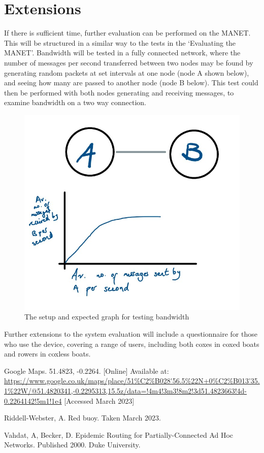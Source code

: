 \documentclass[10pt, a4paper]{article}
\begin{document}
\section{Extensions}
If there is sufficient time, further evaluation can be performed on the MANET. This will be structured in a similar way to the tests in the `Evaluating the MANET'. Bandwidth will be tested in a fully connected network, where the number of messages per second transferred between two nodes may be found by generating random packets at set intervals at one node (node A shown below), and seeing how many are passed to another node (node B below). 
This test could then be performed with both nodes generating and receiving messages, to examine bandwidth on a two way connection.\\
\begin{figure}[h]
\caption{The setup and expected graph for testing bandwidth}
\begin{center}
\includegraphics[scale=0.3]{bandwidth.jpg}
\end{center}
\end{figure}

Further extensions to the system evaluation will include a questionnaire for those who use the device, covering a range of users, including both coxes in coxed boats and rowers in coxless boats. 

\FloatBarrier
\vspace{10px}
\begin{thebibliography}{9} 
Google Maps. 51.4823, -0.2264. [Online] Available at: \url{https://www.google.co.uk/maps/place/51%C2%B028'56.5%22N+0%C2%B013'35.1%22W/@51.4820341,-0.2295313,15.5z/data=!4m4!3m3!8m2!3d51.4823663!4d-0.2264142!5m1!1e4} [Accessed March 2023]

Riddell-Webster, A. Red buoy. Taken March 2023. 

 Vahdat, A, Becker, D. Epidemic Routing for Partially-Connected Ad Hoc Networks. Published 2000. Duke University.
\end{thebibliography}
\end{document}

